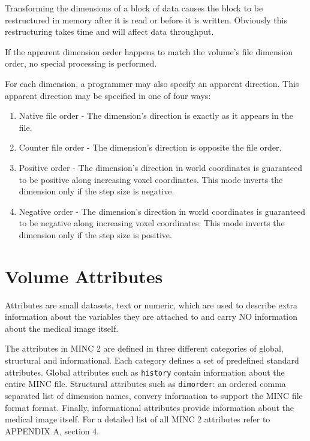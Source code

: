 \documentclass{article}
\begin{document}
Transforming the dimensions of a block of data causes the block to be
restructured in memory after it is read or before it is written.  Obviously
this restructuring takes time and will affect data throughput.

If the apparent dimension order happens to match the volume's file
dimension order, no special processing is performed.

For each dimension, a programmer may also specify an apparent
direction.  This apparent direction may be specified in one of four
ways:
\begin{enumerate}
\item Native file order - The dimension's direction is exactly as it
appears in the file.
\item Counter file order - The dimension's direction is opposite the
file order.
\item Positive order - The dimension's direction in world coordinates
is guaranteed to be positive along increasing voxel coordinates.  This
mode inverts the dimension only if the step size is negative.
\item Negative order - The dimension's direction in world coordinates
is guaranteed to be negative along increasing voxel coordinates.  This
mode inverts the dimension only if the step size is positive.
\end{enumerate}
\section{Volume Attributes}
Attributes are small datasets, text or numeric, which are used to describe extra information about 
the variables they are attached to and carry NO information about the medical image itself.

The attributes in MINC 2 are defined in three different categories of
global, structural and informational. Each category defines a set of predefined standard 
attributes. Global attributes such as 
{\tt history} contain information about the entire MINC file. Structural attributes such 
as {\tt dimorder}: an ordered comma separated list of dimension names, 
convery information to support the MINC file format format. Finally, informational attributes
provide information about the medical image itself. For a detailed list of
all MINC 2 attributes refer to APPENDIX A, section 4.
 
\end{document}
